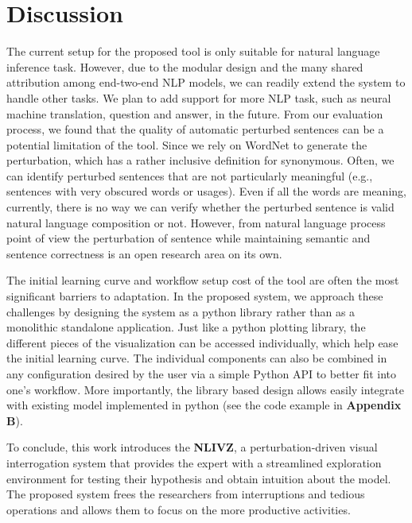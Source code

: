 \section{Discussion}
The current setup for the proposed tool is only suitable for natural language inference task. However, due to the modular design and the many shared attribution among end-two-end NLP models, we can readily extend the system to handle other tasks. We plan to add support for more NLP task, such as neural machine translation, question and answer, in the future.
%
From our evaluation process, we found that the quality of automatic perturbed sentences can be a potential limitation of the tool.
Since we rely on WordNet to generate the perturbation, which has a rather inclusive definition for synonymous. Often, we can identify perturbed sentences that are not particularly meaningful (e.g., sentences with very obscured words or usages). 
Even if all the words are meaning, currently, there is no way we can verify whether the perturbed sentence is valid natural language composition or not.
%
However, from natural language process point of view the perturbation of sentence while maintaining semantic and sentence correctness is an open research area on its own. 

The initial learning curve and workflow setup cost of the tool are often the most significant barriers to adaptation.
In the proposed system, we approach these challenges by designing the system as a python library rather than as a monolithic standalone application. 
Just like a python plotting library, the different pieces of the visualization can be accessed individually, which help ease the initial learning curve. 
The individual components can also be combined in any configuration desired by the user via a simple Python API to better fit into one's workflow.
More importantly, the library based design allows easily integrate with existing model implemented in python (see the code example in \textbf{Appendix B}).

To conclude, this work introduces the \textbf{NLIVZ}, a perturbation-driven visual interrogation system that provides the expert with a streamlined exploration environment for testing their hypothesis and obtain intuition about the model. The proposed system frees the researchers from interruptions and tedious operations and allows them to focus on the more productive activities.


